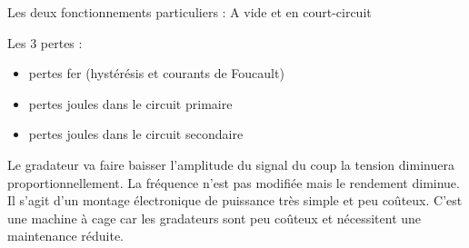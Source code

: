 \begin{questions}
\begin{solution}
Les deux fonctionnements particuliers :
A vide et en court-circuit


 Les 3 pertes :
 \begin{itemize}
\item pertes fer (hystérésis et courants de Foucault)
\item pertes joules dans le circuit primaire
\item pertes joules dans le circuit secondaire
\end{itemize}
\end{solution}

\begin{solution}
Le gradateur va faire baisser l'amplitude du signal du coup la tension diminuera proportionnellement. La fréquence n'est pas modifiée mais le rendement diminue. Il s’agit d’un montage électronique de puissance très simple et peu coûteux.
C'est une machine à cage car les gradateurs sont peu coûteux et nécessitent une maintenance réduite.
\end{solution}

\end{questions}

